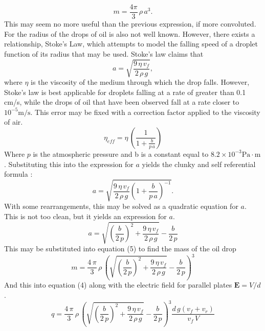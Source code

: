 \documentclass[]{article}
\begin{document}
\begin{equation}
	m = \frac{4\pi}{3}\, \rho \, a^3.
\end{equation}
This may seem no more useful than the previous expression, if more convoluted. For the radius of the drops of oil is also not well known. However, there exists a relationship, Stoke’s Law, which attempts to model the falling speed of a droplet function of its radius that may be used. Stoke’s law claims that
\begin{equation}
a = \sqrt{\frac{9\, \eta \, v_f}{2 \, \rho \, g}},
\end{equation}
where \( \eta \) is the viscosity of the medium through which the drop falls. However, Stoke’s law is best applicable for droplets falling at a rate of greater than 0.1 cm/s, while the drops of oil that have been observed fall at a rate closer to \(10^{-5} \mathrm{m/s}\). This error may be fixed with a correction factor applied to the viscosity of air.
\begin{equation}
\eta_{eff} = \eta \, \left(  \frac{1}{1+\frac{b}{p \, a}} \right)
\end{equation}
Where \( p \) is the atmospheric pressure and b is a constant equal to \( 8.2 \times 10^{-3} \mathrm{Pa \cdot m} \). Substituting this into the expression for \(a\) yields the clunky and self referential formula :
\begin{equation}
a= \sqrt {{\frac {9 \, \eta\,v_{{f}}}{2 \, \rho\,g} \left( 1+{\frac {b}{p \, a}} \right) ^{-1}}}.
\end{equation}
With some rearrangements, this may be solved as a quadratic equation for \(a\). This is not too clean, but it yields an expression for \(a\).
\begin{equation}
a= \sqrt { \left( \frac{b}{2 \, p}  \right)^2 + \frac{9 \, \eta \, v_f }{2 \, \rho \, g} } - \frac{b}{2 \, p}
\end{equation}
This may be substituted into equation (5) to find the mass of the oil drop
\begin{equation}
m = \frac{4 \, \pi }{3} \, \rho \, \left( \sqrt { \left( \frac{b}{2 \, p}  \right)^2 + \frac{9 \, \eta \, v_f }{2 \, \rho \, g} } - \frac{b}{2 \, p} \right)^3
\end{equation}
And this into equation (4) along with the electric field for parallel plates \( \mathbf {E} = V / d\).
\begin{equation}
q = \frac{4 \, \pi }{3} \, \rho \, \left( \sqrt { \left( \frac{b}{2 \, p}  \right)^2 + \frac{9 \, \eta \, v_f }{2 \, \rho \, g} } - \frac{b}{2 \, p} \right)^3 {\frac { d \, g \left( v_{f} + v_{r} \right) }{v_{f} \, V}}
\end{equation}
\end{document}
